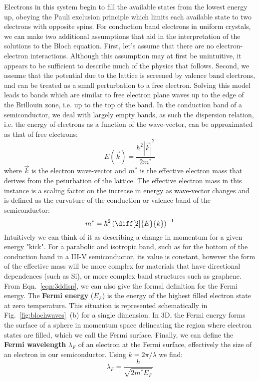 Electrons in this system begin to fill the available states from the lowest energy up, obeying the Pauli exclusion principle which limits
each available state to two electrons with opposite spins. For conduction band electrons in uniform crystals, we can make
two additional assumptions that aid in the interpretation of the solutions to the Bloch equation. First, let's assume that
there are no electron-electron interactions. Although this assumption may at first be unintuitive, it appears
to be sufficient to describe much of the physics that follows. Second, we assume that the potential due to the
lattice is screened by valence band electrons, and can be treated as a small perturbation to a free electron. Solving
this model leads to bands which are similar to free electron plane waves up to the edge of the Brillouin zone, i.e.
up to the top of the band. In the conduction band of a semiconductor, we deal with largely empty bands, as such
the dispersion relation, i.e. the energy of electrons as a function of the wave-vector, can be approximated as that of free electrons:
\begin{equation}
  E(\vec{k}) = \frac{\hbar^2 |\vec{k}|^2}{2m^*}
  \label{eqn:3ddisp}
\end{equation}
where $\vec{k}$ is the electron wave-vector and $m^*$ is the effective electron mass that derives from the peturbation of the lattice.
The effective electron mass in this instance is a scaling factor on the increase in energy as wave-vector changes and is
defined as the curvature of the conduction or valence band of the semiconductor:
\begin{equation}
  m^* = \hbar^2 \left(\diff[2]{E}{k}\right)^{-1}
\end{equation}
Intuitively we can think of it as describing a change in momentum for a given energy "kick". For a parabolic and isotropic
band, such as for the bottom of the conduction band in a III-V semiconductor, its value is constant, however
the form of the effective mass will be more complex for materials that have directional dependences (such as Si),
or more complex band structures such as graphene. From Eqn.~\ref{eqn:3ddisp}, we can also give the
formal definition for the Fermi energy. The \textbf{Fermi energy} ($E_F$) is the energy of the highest filled electron state
at zero temperature. This situation is represented schematically in Fig.~\ref{fig:blochwaves}~(b) for a single dimension.
In 3D, the Fermi energy forms the surface of a sphere in momentum space delineating the region where electron states are filled,
which we call the Fermi surface. Finally, we can define the \textbf{Fermi wavelength} $\lambda_F$ of an electron at the Fermi
surface, effectively the size of an electron in our semiconductor. Using $k = 2\pi/\lambda$ we find:
\begin{equation}
  \lambda_F = \frac{h}{\sqrt{2m^*E_F}}
\end{equation}

